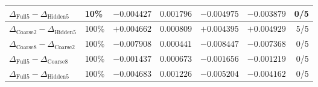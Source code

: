\begin{table}[!htbp]
\begin{tabular}{llrrrrr}
$\Delta_{\mathrm{Full5}}-\Delta_{\mathrm{Hidden5}}$ & 10\% & $-0.004427$ & $0.001796$ & $-0.004975$ & $-0.003879$ & 0/5 \\
\midrule
$\Delta_{\mathrm{Coarse2}}-\Delta_{\mathrm{Hidden5}}$ & 100\% & $+0.004662$ & $0.000809$ & $+0.004395$ & $+0.004929$ & 5/5 \\
$\Delta_{\mathrm{Coarse8}}-\Delta_{\mathrm{Coarse2}}$ & 100\% & $-0.007908$ & $0.000441$ & $-0.008447$ & $-0.007368$ & 0/5 \\
$\Delta_{\mathrm{Full5}}-\Delta_{\mathrm{Coarse8}}$ & 100\% & $-0.001437$ & $0.000673$ & $-0.001656$ & $-0.001219$ & 0/5 \\
$\Delta_{\mathrm{Full5}}-\Delta_{\mathrm{Hidden5}}$ & 100\% & $-0.004683$ & $0.001226$ & $-0.005204$ & $-0.004162$ & 0/5 \\
\bottomrule
\end{tabular}
\end{table}
